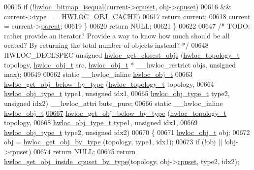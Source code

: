 \begin{DoxyCode}
00615     \textcolor{keywordflow}{if} (!\hyperlink{a00065_ga4dd6a75ab63d33ef33bd626b0e489388}{hwloc_bitmap_isequal}(current->\hyperlink{a00016_a67925e0f2c47f50408fbdb9bddd0790f}{cpuset}, obj->\hyperlink{a00016_a67925e0f2c47f50408fbdb9bddd0790f}{cpuset})
00616         && current->\hyperlink{a00016_acc4f0803f244867e68fe0036800be5de}{type} == \hyperlink{a00041_ggacd37bb612667dc437d66bfb175a8dc55a56ee0b7eca88f363b75b34fdde8c9ddc}{HWLOC_OBJ_CACHE})
00617       \textcolor{keywordflow}{return} current;
00618     current = current->\hyperlink{a00016_adc494f6aed939992be1c55cca5822900}{parent};
00619   \}
00620   \textcolor{keywordflow}{return} NULL;
00621 \}
00622 
00647 \textcolor{comment}{/* TODO: rather provide an iterator? Provide a way to know how much should be all
      ocated? By returning the total number of objects instead? */}
00648 HWLOC\_DECLSPEC \textcolor{keywordtype}{unsigned} \hyperlink{a00058_ga26c2ac4f25b1ed293249c88e232f1bea}{hwloc_get_closest_objs} (\hyperlink{a00039_ga9d1e76ee15a7dee158b786c30b6a6e38}{hwloc_topology_t} topology, 
      \hyperlink{a00016}{hwloc_obj_t} src, \hyperlink{a00016}{hwloc_obj_t} * \_\_hwloc\_restrict objs, \textcolor{keywordtype}{unsigned} max);
00649 
00662 \textcolor{keyword}{static} \_\_hwloc\_inline \hyperlink{a00016}{hwloc_obj_t}
00663 \hyperlink{a00058_ga6c482c2097f01b1ff88598fec8a1ba3b}{hwloc_get_obj_below_by_type} (\hyperlink{a00039_ga9d1e76ee15a7dee158b786c30b6a6e38}{hwloc_topology_t} topology,
00664                              \hyperlink{a00041_gacd37bb612667dc437d66bfb175a8dc55}{hwloc_obj_type_t} type1, \textcolor{keywordtype}{unsigned} idx1,
00665                              \hyperlink{a00041_gacd37bb612667dc437d66bfb175a8dc55}{hwloc_obj_type_t} type2, \textcolor{keywordtype}{unsigned} idx2) \_\_hwloc\_attri
      bute\_pure;
00666 \textcolor{keyword}{static} \_\_hwloc\_inline \hyperlink{a00016}{hwloc_obj_t}
\hypertarget{a00031_source_l00667}{}\hyperlink{a00058_ga6c482c2097f01b1ff88598fec8a1ba3b}{00667} \hyperlink{a00058_ga6c482c2097f01b1ff88598fec8a1ba3b}{hwloc_get_obj_below_by_type} (\hyperlink{a00039_ga9d1e76ee15a7dee158b786c30b6a6e38}{hwloc_topology_t} topology,
00668                              \hyperlink{a00041_gacd37bb612667dc437d66bfb175a8dc55}{hwloc_obj_type_t} type1, \textcolor{keywordtype}{unsigned} idx1,
00669                              \hyperlink{a00041_gacd37bb612667dc437d66bfb175a8dc55}{hwloc_obj_type_t} type2, \textcolor{keywordtype}{unsigned} idx2)
00670 \{
00671   \hyperlink{a00016}{hwloc_obj_t} obj;
00672   obj = \hyperlink{a00047_ga9be4a03488cdd0fb431e4aa1cbdea895}{hwloc_get_obj_by_type} (topology, type1, idx1);
00673   \textcolor{keywordflow}{if} (!obj || !obj->\hyperlink{a00016_a67925e0f2c47f50408fbdb9bddd0790f}{cpuset})
00674     \textcolor{keywordflow}{return} NULL;
00675   \textcolor{keywordflow}{return} \hyperlink{a00054_gaa8dcdb85224f7350b90fb0a1ca91e6d6}{hwloc_get_obj_inside_cpuset_by_type}(topology, obj->\hyperlink{a00016_a67925e0f2c47f50408fbdb9bddd0790f}{cpuset}, type2, idx2);
      

\end{DoxyCode}
